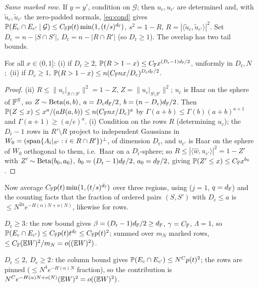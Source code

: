 \emph{Same marked row.} If $y=y'$, condition on $\mathcal G$; then $u_c,u_{c'}$ are determined and, with
$\tilde u_c,\tilde u_{c'}$ the zero-padded normals, \eqref{eq:cond} gives
$\mathbb{P}(E_c\cap E_{c'}\mid\mathcal G)\le C_{\mathbb{F}} p(t)\min(1,(t/s)^{d_{\mathbb{F}}})$, $s^2=1-R$,
$R=|\langle\tilde u_c,\tilde u_{c'}\rangle|^2$. Set $D_{\mathrm c}=n-|S\cap S'|$, $D_{\mathrm r}=n-|R\cap R'|$
(so $D_{\mathrm r}\ge1$). The overlap has two tail bounds.

\begin{lemma}\label{lem:overlaptail}
For all $x\in(0,1]$:
{\rm(i)} if $D_{\mathrm r}\ge2$, $\mathbb{P}(R>1-x)\le C_{\mathbb{F}} x^{(D_{\mathrm r}-1)d_{\mathbb{F}}/2}$, uniformly in
$D_{\mathrm r},N$;\ {\rm(ii)} if $D_{\mathrm c}\ge1$, $\mathbb{P}(R>1-x)\le n(C_{\mathbb{F}} nx/D_{\mathrm c})^{D_{\mathrm c}d_{\mathbb{F}}/2}$.
\end{lemma}
\begin{proof}
(ii) $R\le\|u_c|_{S\cap S'}\|^2=1-Z$, $Z=\|u_c|_{S\setminus S'}\|^2$; $u_c$ is Haar on the sphere of
$\mathbb{F}^S$, so $Z\sim\operatorname{Beta}(a,b)$, $a=D_{\mathrm c}d_{\mathbb{F}}/2$, $b=(n-D_{\mathrm c})d_{\mathbb{F}}/2$. Then
$\mathbb{P}(Z\le x)\le x^a/(aB(a,b))\le n(C_{\mathbb{F}} nx/D_{\mathrm c})^a$ by $\Gamma(a+b)\le\Gamma(b)(a+b)^{a+1}$ and
$\Gamma(a+1)\ge(a/e)^a$. (i) Condition on the rows $R$ (determining $u_c$); the $D_{\mathrm r}-1$ rows in
$R'\setminus R$ project to independent Gaussians in $W_0=(\operatorname{span}\{A_i|_{S'}:i\in R\cap R'\})^\perp$, of
dimension $D_{\mathrm r}$, and $u_{c'}$ is Haar on the sphere of $W_0$ orthogonal to them, i.e.\ Haar on
a $D_{\mathrm r}$-sphere; so $R\le|\langle\hat w,u_{c'}\rangle|^2=1-Z'$ with $Z'\sim\operatorname{Beta}(b_0,a_0)$,
$b_0=(D_{\mathrm r}-1)d_{\mathbb{F}}/2$, $a_0=d_{\mathbb{F}}/2$, giving $\mathbb{P}(Z'\le x)\le C_{\mathbb{F}} x^{b_0}$.
\end{proof}

Now average $C_{\mathbb{F}} p(t)\min(1,(t/s)^{d_{\mathbb{F}}})$ over three regions, using  ($j=1$, $q=d_{\mathbb{F}}$)
and the counting facts that the fraction of ordered pairs $(S,S')$ with $D_{\mathrm c}\le a$ is
$\le N^{2a}e^{-H(\alpha)N+o(N)}$, likewise for rows.

\emph{$D_{\mathrm r}\ge3$:} the row bound gives $\beta=(D_{\mathrm r}-1)d_{\mathbb{F}}/2\ge d_{\mathbb{F}}$, $\gamma=C_{\mathbb{F}}$,
$\Lambda=1$, so $\mathbb{P}(E_c\cap E_{c'})\le C_{\mathbb{F}} p(t)t^{d_{\mathbb{F}}}\le C_{\mathbb{F}} p(t)^2$; summed over $m_N$ marked rows,
$\le C_{\mathbb{F}}(\mathbb{E} W)^2/m_N=o((\mathbb{E} W)^2)$.

\emph{$D_{\mathrm r}\le2$, $D_{\mathrm c}\ge2$:} the column bound gives
$\mathbb{P}(E_c\cap E_{c'})\le N^Cp(t)^2$; the rows are pinned ($\le N^4e^{-H(\alpha)N}$ fraction), so the
contribution is $N^Ce^{-H(\alpha)N+o(N)}(\mathbb{E} W)^2=o((\mathbb{E} W)^2)$.

